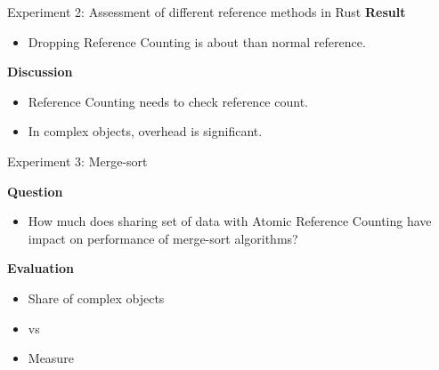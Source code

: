 \documentclass[9pt]{beamer}
\begin{document}
\begin{frame}[fragile]{Experiment 2: Assessment of different reference methods in Rust}
    \textbf{Result}
    \begin{itemize}
        \item Dropping Reference Counting is about  than normal reference.
    \end{itemize}

    \vspace{0.5cm}

    \textbf{Discussion}
    \begin{itemize}
        \item Reference Counting needs to check reference count.
        \item In complex objects, overhead is significant.
    \end{itemize}
\end{frame}


\begin{frame}[fragile]{Experiment 3: Merge-sort}

    \textbf{Question}
    \begin{itemize}
        \item How much does sharing set of data with Atomic Reference Counting have impact on performance of merge-sort algorithms?
    \end{itemize}

    \vspace{0.5cm}

    \textbf{Evaluation}
    \begin{itemize}
        \item Share  of complex objects
        \item {} vs 
        \item Measure 
    \end{itemize}

\end{frame}

\end{document}
